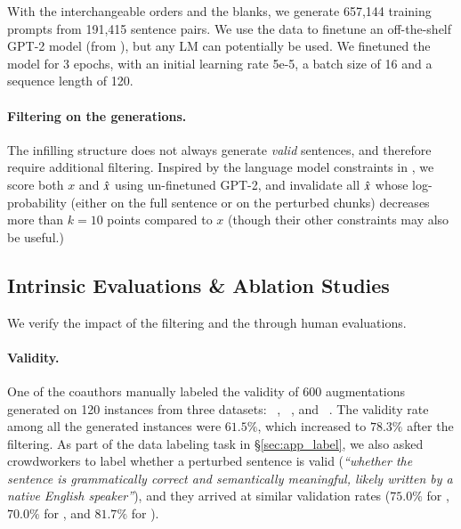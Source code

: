 With the interchangeable orders and the blanks, we generate 657,144 training prompts from 191,415 sentence pairs.
We use the data to finetune an off-the-shelf GPT-2 model (from \citet{Wolf2019HuggingFacesTS}), but any LM can potentially be used.
We finetuned the model for 3 epochs, with an initial learning rate 5e-5, a batch size of 16 and a sequence length of 120.

\paragraph{Filtering on the generations.}
The infilling structure does not always generate \emph{valid} sentences, and therefore require additional filtering.
Inspired by the language model constraints in \citet{morris2020textattack}, we score both $x$ and $\hat{x}$ using un-finetuned GPT-2, and invalidate all $\hat{x}$ whose log-probability (either on the full sentence or on the perturbed chunks) decreases more than $k=10$ points compared to $x$ (though their other constraints may also be useful.)




\subsection{Intrinsic Evaluations \& Ablation Studies}
We verify the impact of the filtering and the \tagstrs through human evaluations.
\paragraph{Validity.}
One of the coauthors manually labeled the validity of 600 augmentations generated on 120 instances from three datasets: \dsst~\cite{socher2013recursive}, \dnli~\cite{bowman-etal-2015-large}, and \dqqp~\cite{wang2018glue}.
The validity rate among all the generated instances were $61.5\%$, which increased to $78.3\%$ after the filtering. 
As part of the data labeling task in \S\ref{sec:app_label}, we also asked crowdworkers to label whether a perturbed sentence is valid (\emph{``whether the sentence is grammatically correct and semantically meaningful, likely written by a native English speaker''}), and they arrived at similar validation rates ($75.0\%$ for \dsst, $70.0\%$ for \dqqp, and $81.7\%$ for \dnli).


